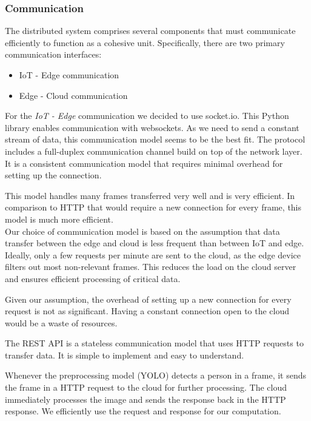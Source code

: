 \documentclass[conference]{IEEEtran}
\begin{document}
\subsubsection{Communication}
The distributed system comprises several components that must communicate efficiently to function as a cohesive unit. Specifically, there are two primary communication interfaces:
\\
\begin{itemize}
    \item IoT - Edge communication
    \item Edge - Cloud communication
\end{itemize}

\hfill \break
For the \textit{IoT - Edge} communication we decided to use socket.io. This Python library enables communication with websockets. As we need to send a constant stream of data, this communication model seems to be the best fit. The protocol includes a full-duplex communication channel build on top of the network layer. It is a consistent communication model that requires minimal overhead for setting up the connection. 

This model handles many frames transferred very well and is very efficient. In comparison to HTTP that would require a new connection for every frame, this model is much more efficient. 
\\

Our choice of communication model is based on the assumption that data transfer between the edge and cloud is less frequent than between IoT and edge. Ideally, only a few requests per minute are sent to the cloud, as the edge device filters out most non-relevant frames. This reduces the load on the cloud server and ensures efficient processing of critical data.

Given our assumption, the overhead of setting up a new connection for every request is not as significant. Having a constant connection open to the cloud would be a waste of resources. 

The REST API is a stateless communication model that uses HTTP requests to transfer data. It is simple to implement and easy to understand. 

Whenever the preprocessing model (YOLO) detects a person in a frame, it sends the frame in a HTTP request to the cloud for further processing. 
The cloud immediately processes the image and sends the response back in the HTTP response. We efficiently use the request and response for our computation. 
\hfill \break
\end{document}

